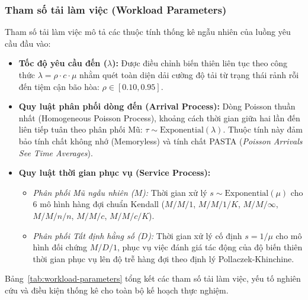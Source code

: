 \subsubsection{Tham số tải làm việc (Workload Parameters)}
\hspace{0.5cm}Tham số tải làm việc mô tả các thuộc tính thống kê ngẫu nhiên của luồng yêu cầu đầu vào:
\begin{itemize}[leftmargin=1.5em]
    \item \textbf{Tốc độ yêu cầu đến ($\lambda$):} Được điều chỉnh biến thiên liên tục theo công thức $\lambda = \rho \cdot c \cdot \mu$ nhằm quét toàn diện dải cường độ tải từ trạng thái rảnh rỗi đến tiệm cận bão hòa: $\rho \in [0.10, 0.95]$.
    \item \textbf{Quy luật phân phối dòng đến (Arrival Process):} Dòng Poisson thuần nhất (Homogeneous Poisson Process), khoảng cách thời gian giữa hai lần đến liên tiếp tuân theo phân phối Mũ: $\tau \sim \text{Exponential}(\lambda)$. Thuộc tính này đảm bảo tính chất không nhớ (Memoryless) và tính chất PASTA (\textit{Poisson Arrivals See Time Averages}).
    \item \textbf{Quy luật thời gian phục vụ (Service Process):}
    \begin{itemize}
        \item \textit{Phân phối Mũ ngẫu nhiên ($M$):} Thời gian xử lý $s \sim \text{Exponential}(\mu)$ cho 6 mô hình hàng đợi chuẩn Kendall ($M/M/1$, $M/M/1/K$, $M/M/\infty$, $M/M/n/n$, $M/M/c$, $M/M/c/K$).
        \item \textit{Phân phối Tất định hằng số ($D$):} Thời gian xử lý cố định $s = 1/\mu$ cho mô hình đối chứng $M/D/1$, phục vụ việc đánh giá tác động của độ biến thiên thời gian phục vụ lên độ trễ hàng đợi theo định lý Pollaczek-Khinchine.
    \end{itemize}
\end{itemize}

Bảng~\ref{tab:workload-parameters} tổng kết các tham số tải làm việc, yếu tố nghiên cứu và điều kiện thống kê cho toàn bộ kế hoạch thực nghiệm.

